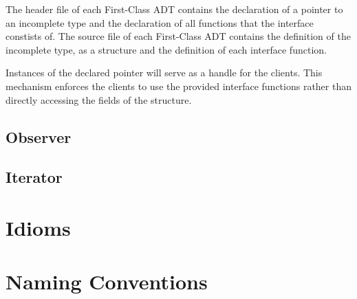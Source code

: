 The header file of each First-Class ADT contains the declaration of a pointer to an incomplete type and the declaration of all functions that the interface constists of. The source file of each First-Class ADT contains the definition of the incomplete type, as a structure and the definition of each interface function.

Instances of the declared pointer will serve as a handle for the clients. This mechanism enforces the clients to use the provided interface functions rather than directly accessing the fields of the structure.

\subsection{Observer}

\subsection{Iterator}

\section{Idioms}

\section{Naming Conventions}
